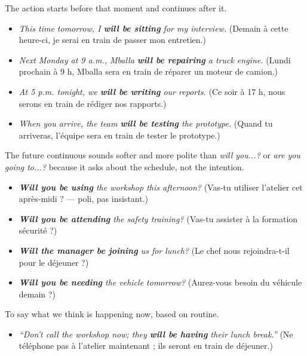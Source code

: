 \documentclass[11pt]{article}
\begin{document}
\begin{propriete}
The action starts before that moment and continues after it.
\begin{itemize}
    \item \emph{This time tomorrow, I \textbf{will be sitting} for my interview.} (Demain à cette heure-ci, je serai en train de passer mon entretien.)
    \item \emph{Next Monday at 9 a.m., Mballa \textbf{will be repairing} a truck engine.} (Lundi prochain à 9 h, Mballa sera en train de réparer un moteur de camion.)
    \item \emph{At 5 p.m. tonight, we \textbf{will be writing} our reports.} (Ce soir à 17 h, nous serons en train de rédiger nos rapports.)
    \item \emph{When you arrive, the team \textbf{will be testing} the prototype.} (Quand tu arriveras, l'équipe sera en train de tester le prototype.)
\end{itemize}
\end{propriete}

\begin{propriete}
The future continuous sounds softer and more polite than \emph{will you...?} or \emph{are you going to...?} because it asks about the schedule, not the intention.
\begin{itemize}
    \item \emph{\textbf{Will you be using} the workshop this afternoon?} (Vas-tu utiliser l'atelier cet après-midi ? — poli, pas insistant.)
    \item \emph{\textbf{Will you be attending} the safety training?} (Vas-tu assister à la formation sécurité ?)
    \item \emph{\textbf{Will the manager be joining} us for lunch?} (Le chef nous rejoindra-t-il pour le déjeuner ?)
    \item \emph{\textbf{Will you be needing} the vehicle tomorrow?} (Aurez-vous besoin du véhicule demain ?)
\end{itemize}
\end{propriete}

\begin{propriete}
To say what we think is happening now, based on routine.
\begin{itemize}
    \item \emph{``Don't call the workshop now; they \textbf{will be having} their lunch break.''} (Ne téléphone pas à l'atelier maintenant ; ils seront en train de déjeuner.)
\end{itemize}
\end{propriete}
\end{document}
